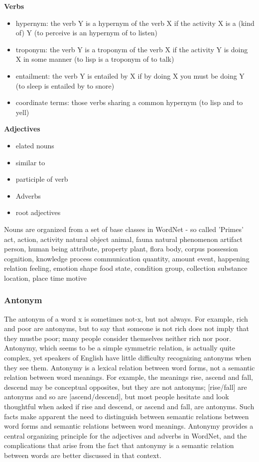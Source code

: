 \textbf{Verbs}
\begin{itemize}
\item hypernym: the verb Y is a hypernym of the verb X if the activity X is a (kind of) Y (to perceive is an hypernym of to listen)
\item troponym: the verb Y is a troponym of the verb X if the activity Y is doing X in some manner (to lisp is a troponym of to talk)
\item entailment: the verb Y is entailed by X if by doing X you must be doing Y (to sleep is entailed by to snore)
\item coordinate terms: those verbs sharing a common hypernym (to lisp and to yell)
\end{itemize}

\textbf{Adjectives}
\begin{itemize}
\item elated nouns
\item similar to
\item participle of verb
\item Adverbs
\item root adjectives
\end{itemize}

Nouns are organized from a set of base classes in WordNet - so called 'Primes'
{act, action, activity}
{natural object}
{animal, fauna}
{natural phenomenon}
{artifact}
{person, human being}
{attribute, property}
{plant, flora}
{body, corpus}
{possession}
{cognition, knowledge}
{process}
{communication}
{quantity, amount}
{event, happening}
{relation}
{feeling, emotion}
{shape}
{food}
{state, condition}
{group, collection}
{substance}
{location, place}
{time}
{motive}


\subsubsection{Antonym}
The antonym of a word x is sometimes not-x, but not always. For example, rich
and poor are antonyms, but to say that someone is not rich does not imply that they mustbe poor; many people consider themselves neither rich nor poor. Antonymy, which seems to be a simple symmetric relation, is actually quite complex, yet speakers of English have little difficulty recognizing antonyms when they see them. Antonymy is a lexical relation between word forms, not a semantic relation between word meanings. For example, the meanings {rise, ascend} and {fall, descend} may be conceptual opposites, but they are not antonyms; [rise/fall] are antonyms and so are [ascend/descend], but most people hesitate and look thoughtful when asked if rise and descend, or ascend and fall, are antonyms. Such facts make apparent the need to distinguish between semantic relations between word forms and semantic relations between word meanings. Antonymy provides a central organizing principle for the adjectives and adverbs in WordNet, and the complications that arise from the fact that antonymy is a semantic relation between words are better discussed in that context.
